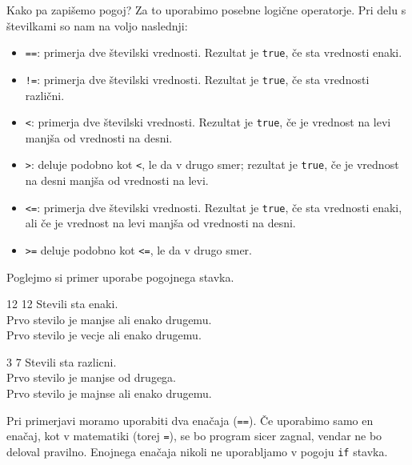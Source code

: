 \documentclass{book}
\begin{document}
Kako pa zapišemo pogoj? Za to uporabimo posebne logične operatorje. Pri delu s
številkami so nam na voljo naslednji:
\begin{itemize}
  \item \verb+==+: primerja dve številski vrednosti.
	Rezultat je \verb+true+, če sta vrednosti enaki.
  \item \verb+!=+: primerja dve številski vrednosti.
	Rezultat je \verb+true+, če sta vrednosti različni.
  \item \verb+<+: primerja dve številski vrednosti.
	Rezultat je \verb+true+, če je vrednost na levi manjša od vrednosti na desni.
  \item \verb+>+: deluje podobno kot \verb+<+, le da v drugo smer;
	rezultat je \verb+true+, če je vrednost na desni manjša od vrednosti na levi.
  \item \verb+<=+: primerja dve številski vrednosti.
	Rezultat je \verb+true+, če sta vrednosti enaki, ali če je vrednost
	na levi manjša od vrednosti na desni.
  \item \verb+>=+ deluje podobno kot \verb+<=+, le da v drugo smer.
\end{itemize}

\begin{examples}

Poglejmo si primer uporabe pogojnega stavka.


\begin{inout}
12 12
\tcblower
Stevili sta enaki.\\
Prvo stevilo je manjse ali enako drugemu.\\
Prvo stevilo je vecje ali enako drugemu.
\end{inout}

\begin{inout}
3 7
\tcblower
Stevili sta razlicni.\\
Prvo stevilo je manjse od drugega.\\
Prvo stevilo je majnse ali enako drugemu.
\end{inout}

\end{examples}


\begin{errors}
  Pri primerjavi moramo uporabiti dva enačaja (\verb+==+). Če uporabimo samo
  en enačaj, kot v matematiki (torej \verb+=+), se bo program sicer zagnal,
  vendar ne bo deloval pravilno.
  Enojnega enačaja nikoli ne uporabljamo v pogoju \verb+if+ stavka.
\end{errors}
\end{document}
